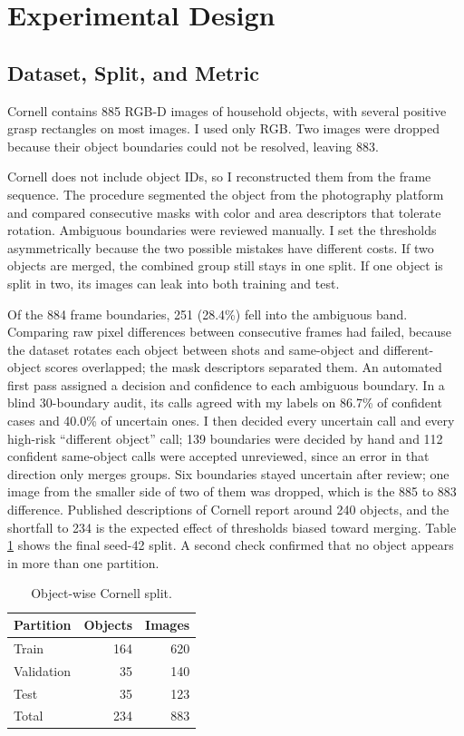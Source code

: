 \documentclass[10pt,conference]{IEEEtran}
\begin{document}
\section{Experimental Design}

\subsection{Dataset, Split, and Metric}

Cornell contains 885 RGB-D images of household objects, with several positive
grasp rectangles on most images. I used only RGB. Two images were dropped
because their object boundaries could not be resolved, leaving 883.

Cornell does not include object IDs, so I reconstructed them from the frame
sequence. The procedure segmented the object from the photography platform
and compared consecutive masks with color and area descriptors that tolerate
rotation. Ambiguous boundaries were reviewed manually. I set the thresholds
asymmetrically because the two possible mistakes have different costs. If two
objects are merged, the combined group still stays in one split. If one
object is split in two, its images can leak into both training and test.

Of the 884 frame boundaries, 251 (28.4\%) fell into the ambiguous band.
Comparing raw pixel differences between consecutive frames had failed,
because the dataset rotates each object between shots and same-object and
different-object scores overlapped; the mask descriptors separated them.
An automated first pass assigned a decision and confidence to each ambiguous
boundary. In a blind 30-boundary audit, its calls agreed with my labels on
86.7\% of confident cases and 40.0\% of uncertain ones. I then decided every
uncertain call and every high-risk ``different object'' call; 139
boundaries were decided by hand and 112 confident same-object calls were
accepted unreviewed, since an error in that direction only merges groups.
Six boundaries stayed uncertain after review; one image from the smaller
side of two of them was dropped, which is the 885 to 883 difference.
Published descriptions of Cornell report around 240 objects, and the
shortfall to 234 is the expected effect of thresholds biased toward
merging. Table
\ref{tab:split} shows the final seed-42 split. A second check confirmed that
no object appears in more than one partition.

\begin{table}[t]
\caption{Object-wise Cornell split.}
\label{tab:split}
\centering
\begin{tabular}{lrr}
\toprule
Partition & Objects & Images \\
\midrule
Train & 164 & 620 \\
Validation & 35 & 140 \\
Test & 35 & 123 \\
\midrule
Total & 234 & 883 \\
\bottomrule
\end{tabular}
\end{table}
\end{document}
